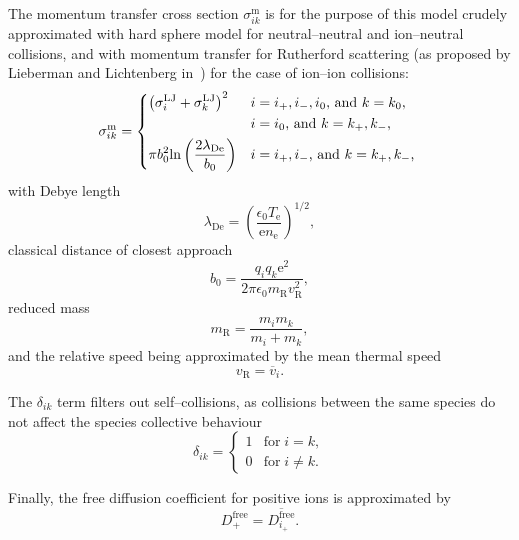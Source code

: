 The momentum transfer cross section $\sigma^{\mathrm{m}}_{ik}$ is for the purpose of this model crudely approximated
with hard sphere model for neutral--neutral and ion--neutral collisions, and with momentum transfer for
Rutherford scattering (as proposed by Lieberman and Lichtenberg in~\cite{lieberman_principles_2005}) for the
case of ion--ion collisions:
\begin{equation}
    \sigma^{\mathrm{m}}_{ik} =
    \begin{dcases*}
        \left( \sigma^{\mathrm{LJ}}_{i} + \sigma^{\mathrm{LJ}}_{k} \right) ^{2} &
        $i = i_{+}, i_{-}, i_{0}$, and $ k = k_{0}$, \\
        &
        $i = i_{0}$, and $k = k_{+}, k_{-}$, \\
        \pi b_{0}^{2} \mathrm{ln}\left( \dfrac{2 \lambda_{\mathrm{De}}}{b_{0}} \right) &
        $i = i_{+}, i_{-}$, and $k = k_{+}, k_{-}$, \\
    \end{dcases*}
\end{equation}
with Debye length
\begin{equation}
    \lambda_{\mathrm{De}} = \left( \frac{\epsilon_{0} T_{\mathrm{e}}}{\mathrm{e} n_{\mathrm{e}}} \right)^{1/2},
\end{equation}
classical distance of closest approach
\begin{equation}
    b_{0} = \frac{q_{i}q_{k} \mathrm{e}^{2}}{2 \pi \epsilon_{0} m_{\mathrm{R}} v_{\mathrm{R}}^{2}},
\end{equation}
reduced mass
\begin{equation}
    m_{\mathrm{R}} = \frac{m_{i} m_{k}}{m_{i} + m_{k}},
\end{equation}
and the relative speed being approximated by the mean thermal speed
\begin{equation}
    v_{\mathrm{R}} = \overline{v}_{i}.
\end{equation}

The $\delta_{ik}$ term filters out self--collisions, as collisions between the same species do not affect the species
collective behaviour
\begin{equation}
    \delta_{ik} =
    \begin{cases}
        1 & \mathrm{for}\; i = k, \\
        0 & \mathrm{for}\; i \neq k.
    \end{cases}
\end{equation}

Finally, the free diffusion coefficient for positive ions is approximated by
\begin{equation}
    D_{+}^{\mathrm{free}} = \overline{D_{i_{+}}^{\mathrm{free}}}.
\end{equation}

